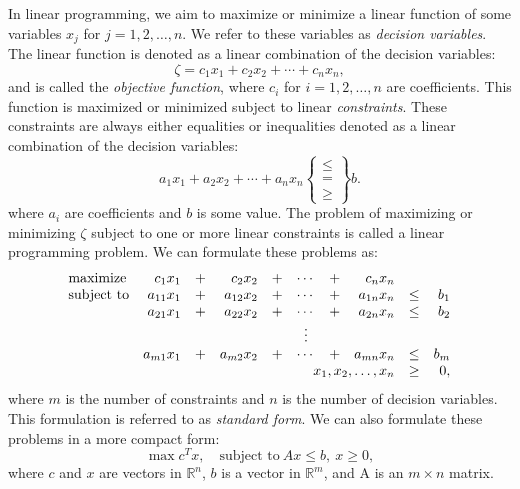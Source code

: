 
In linear programming, we aim to maximize or minimize a linear function of
some variables $x_j$ for $j=1,2,\ldots,n$. We refer to these variables as
\textit{decision variables}. The linear function is denoted as a linear
combination of the decision variables:
\[
\zeta = c_1 x_1 + c_2 x_2 + \cdots + c_n x_n,
\]
and is called the \textit{objective function}, where $c_i$ for $i=1,2,\ldots,n$
are coefficients.
This function is maximized
or minimized subject to linear \textit{constraints}. These constraints are
always either equalities or inequalities denoted as a linear combination
of the decision variables:
\[
a_1x_1 + a_2 x_2 + \cdots + a_n x_n \left\{\begin{array}{c} \leq \\ = \\ \geq \end{array}\right\} b.
\]
where $a_i$ are coefficients and $b$ is some value.
The problem of maximizing or minimizing $\zeta$ subject to one or more
linear constraints is called a linear programming problem.
We can formulate these problems as:
\[
\begin{array}{lrcrcccrcr}
\textrm{maximize}   & c_1 x_1    &+& c_2 x_2    &+& \cdots &+& c_n x_n               \\
\textrm{subject to} & a_{11} x_1 &+& a_{12} x_2 &+& \cdots &+& a_{1n} x_n &\leq& b_1 \\
                    & a_{21} x_1 &+& a_{22} x_2 &+& \cdots &+& a_{2n} x_n &\leq& b_2 \\
                    &            & &            & & \vdots & &            &    &     \\
                    & a_{m1} x_1 &+& a_{m2} x_2 &+& \cdots &+& a_{mn} x_n &\leq& b_m \\
                    \multicolumn{8}{r}{x_1,x_2,\ldots,x_n} &\geq& 0,
\end{array}
\]
where $m$ is the number of constraints and $n$ is the number of decision variables.
This formulation is referred to as \textit{standard form}\cite{vanderbei}.
We can also formulate these problems in a more compact form:
\begin{equation}
\max{c^T x},\quad \textrm{subject to}~Ax \leq b, ~ x \geq 0, \label{eq:primal}
\end{equation}
where $c$ and $x$ are vectors in $\mathbb{R}^n$, $b$ is a vector in $\mathbb{R}^m$, and
A is an $m \times n$ matrix.

